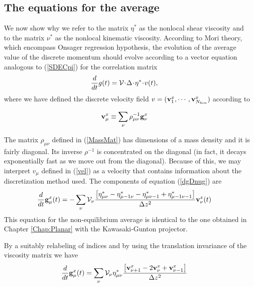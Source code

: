 \documentclass[b5paper,openright,10pt]{book}
\newcommand{\esc}{\!\cdot\!}
\begin{document}
\subsection{The equations for the average}

We now show why we refer to the matrix $\eta^*$ as the nonlocal shear
viscosity  and  to  the  matrix $\nu^*$  as  the  nonlocal  kinematic
viscosity.   According   to  Mori  theory,  which   encompass  Onsager
regression  hypothesis, the  evolution  of the  average  value of  the
discrete momentum should evolve according to a vector equation analogous to
(\ref{SDECpi}) for the correlation matrix
\begin{align}
  \frac{d}{dt}g(t)&={\cal V}\esc \Delta\esc\eta^*\esc v(t),
\label{dgDnug}
\end{align}
where we have defined the discrete velocity field $v=({\bf v}_1^{x},\cdots,{\bf v}^{x}_{N_{bin}})$ according to

\begin{align}
  {\bf v}^{x}_\mu&\equiv\sum_\nu \rho_{\mu\nu}^{-1}{\bf g}^{x}_\nu
\label{vel}
\end{align}

The matrix  $\rho_{\mu\nu}$ defined in (\ref{MassMat})  has dimensions
of a mass density and it  is fairly diagonal.  Its inverse $\rho^{-1}$
is concentrated on the diagonal (in fact, it decays exponentially fast
as we move out from the diagonal).  Because of this, we may interpret
$v_\mu$ defined in (\ref{vel}) as a velocity that contains information
about   the   discretization   method   used.    The components of
equation (\ref{dgDnug}) are
\begin{align}
  \frac{d}{dt}{\bf g}^x_\mu(t)&=
-\sum_\nu{\cal V}_\nu 
\frac{\left[
\eta^*_{\mu\nu}-\eta^*_{\mu-1\nu}-\eta^*_{\mu\nu-1}+\eta^*_{\mu-1\nu-1}\right]}{\Delta z^2}{\bf v}_\nu^{x}(t)
\end{align}
This equation for the non-equilibrium  average is identical to the one
obtained in Chapter \ref{Chap:Planar} with the Kawasaki-Gunton projector.

By a suitably relabeling  of indices and 
by using the translation invariance of the viscosity matrix we have
\begin{align}
  \frac{d}{dt}{\bf g}^x_\mu(t)&=\sum_\nu{\cal V}_\nu \eta^*_{\mu\nu}
\frac{\left[{\bf v}_{\nu+1}^{x}-2{\bf v}_{\nu}^{x}+{\bf v}_{\nu-1}^{x}\right]}{\Delta z^2}
\label{SDELap0} 
\end{align}
\end{document}
